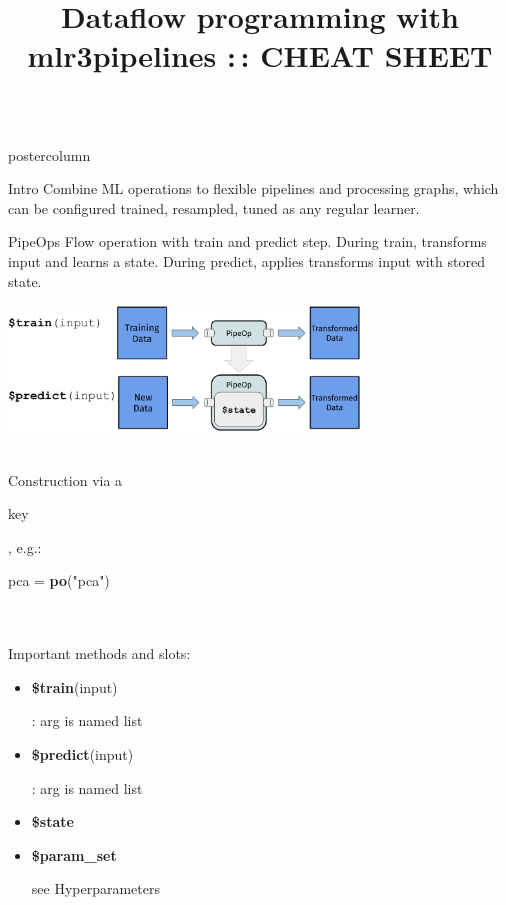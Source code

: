 \documentclass{beamer}
\title{Dataflow programming with mlr3pipelines :\,: CHEAT SHEET} %
\newlength{\columnheight} %
\newcommand{\codeinline}[1]{\begin{codeboxinline}#1\end{codeboxinline}}
\begin{document}
\begin{frame}[fragile]{}
	\begin{columns}
		\begin{column}{.245\textwidth}
			\begin{beamercolorbox}[center]{postercolumn}
				\begin{minipage}{.98\textwidth}
					\parbox[t][\columnheight]{\textwidth}{
						\begin{myblock}{Intro}
              Combine ML operations to flexible pipelines and processing graphs, which can be configured trained, resampled, tuned as any regular learner.
            \end{myblock}
						\begin{myblock}{PipeOps}
              Flow operation with train and predict step. During train, transforms input and learns a state. During predict, applies transforms input with stored state.
              \begin{center}
                \includegraphics[width=0.7\textwidth]{img/po.pdf}
              \end{center}
              \ \\
              Construction via a \codeinline{key}, e.g.: \codeinline{pca = \textbf{po}("pca")} \\
              \ \\
              Important methods and slots:
              \begin{itemize}
                \item \codeinline{\textbf{\$train}(input)}: arg is named list
                \item \codeinline{\textbf{\$predict}(input)}: arg is named list
                \item \codeinline{\textbf{\$state}} 
                \item \codeinline{\textbf{\$param\_set}} see Hyperparameters

\end{itemize}
\end{myblock}}
\end{minipage}
\end{beamercolorbox}
\end{column}
\end{columns}
\end{frame}
\end{document}
